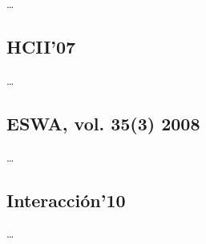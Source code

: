 \ldots

\subsection{HCII’07}
\ldots




\subsection{ESWA, vol. 35(3) 2008}
\ldots


\subsection{Interacción’10}
\ldots



